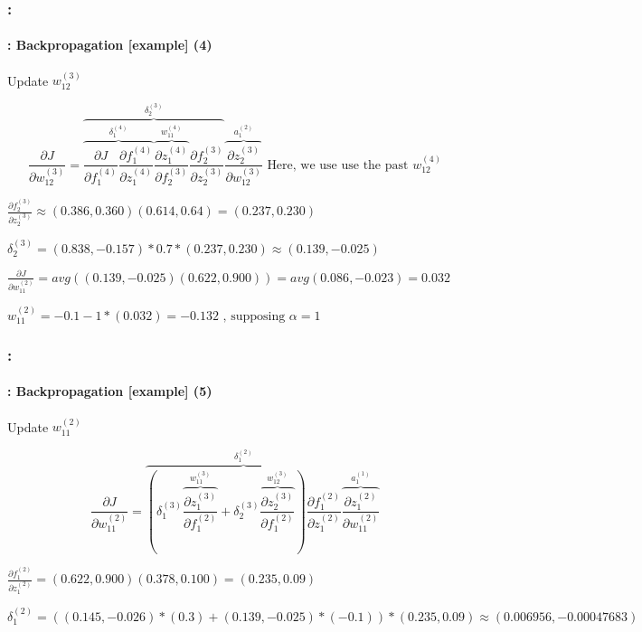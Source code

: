 \documentclass[xcolor=table]{beamer}
\begin{document}
\begin{frame}
	\frametitle{\insertshortsubtitle: \insertsection}
	\framesubtitle{\insertsubsection: Backpropagation [example] (4)}
	
	Update $w_{12}^{(3)}$
	
	\small
	
	\[
	\frac{\partial J}{\partial w_{12}^{(3)}} = 
	\overbrace{
		\overbrace{
			\frac{\partial J}{\partial f_{1}^{(4)}} 
			\frac{\partial f_{1}^{(4)}}{\partial z_{1}^{(4)}}
		}^{\delta_{1}^{(4)}} 
		\overbrace{
			\frac{\partial z_{1}^{(4)}}{\partial f_{2}^{(3)}}
		}^{w_{11}^{(4)}} 
		\frac{\partial f_{2}^{(3)}}{\partial z_{2}^{(3)}} 
	}^{\delta_{2}^{(3)}} 
	\overbrace{
		\frac{\partial z_{2}^{(3)}}{\partial w_{12}^{(3)}}
	}^{a_{1}^{(2)}}
	\text{ Here, we use use the past } w_{12}^{(4)}
	\]
	
	$
	\frac{\partial f_{2}^{(3)}}{\partial z_{2}^{(3)}} \approx 
	(0.386, 0.360) (0.614, 0.64) = (0.237, 0.230)
	$
	
	$
	\delta_{2}^{(3)} = (0.838, -0.157) * 0.7 * (0.237, 0.230) \approx (0.139, -0.025)
	$
	
	$
	\frac{\partial J}{\partial w_{11}^{(2)}} = avg((0.139, -0.025) (0.622, 0.900)) 
	= avg(0.086, -0.023) = 0.032
	$
	
	$
	w_{11}^{(2)} = - 0.1 - 1 * (0.032) = - 0.132 \text{ , supposing } \alpha = 1
	$

\end{frame}


\begin{frame}
	\frametitle{\insertshortsubtitle: \insertsection}
	\framesubtitle{\insertsubsection: Backpropagation [example] (5)}
	
	Update $w_{11}^{(2)}$
	
	\small
	
	\[
	\frac{\partial J}{\partial w_{11}^{(2)}} = 
	\overbrace{ 
		\left(
		\delta_{1}^{(3)} 
		\overbrace{
			\frac{\partial z_{1}^{(3)}}{\partial f_{1}^{(2)}}
		}^{w_{11}^{(3)}}
		+
		\delta_{2}^{(3)} 
		\overbrace{
			\frac{\partial z_{2}^{(3)}}{\partial f_{1}^{(2)}}
		}^{w_{12}^{(3)}}
		\right)
		\frac{\partial f_{1}^{(2)}}{\partial z_{1}^{(2)}}
	}^{\delta_{1}^{(2)}} 
	\overbrace{
		\frac{\partial z_{1}^{(2)}}{\partial w_{11}^{(2)}}
	}^{a_{1}^{(1)}}
	\]
	
	$
	\frac{\partial f_{1}^{(2)}}{\partial z_{1}^{(2)}} = (0.622, 0.900) (0.378, 0.100) = (0.235, 0.09)
	$
	
	$
	\delta_{1}^{(2)} = \left((0.145, -0.026) * (0.3) + (0.139, -0.025) * (-0.1)\right) * (0.235, 0.09) \approx (0.006956, -0.00047683)
	$
	
	

\end{frame}
\end{document}
